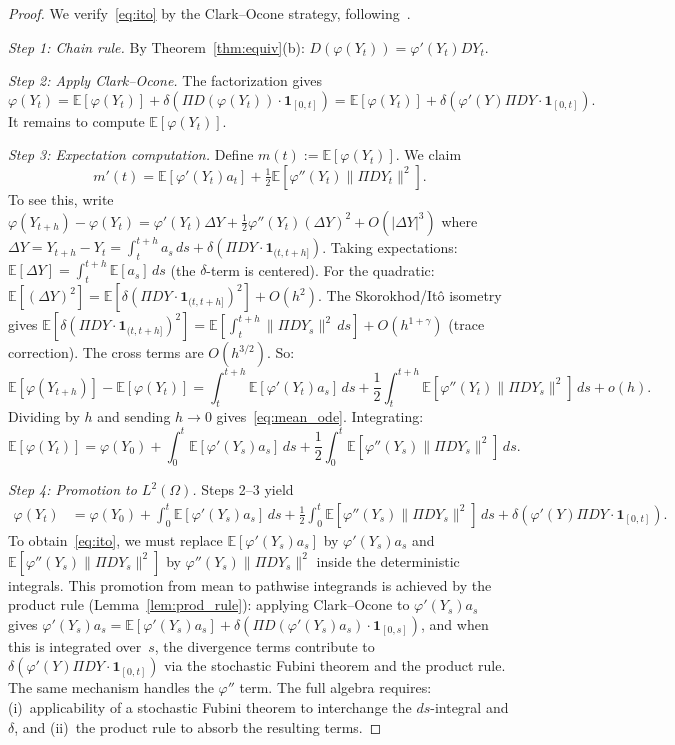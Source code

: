 \documentclass[11pt,a4paper]{article}
\theoremstyle{plain}
\theoremstyle{definition}
\theoremstyle{remark}
\newcommand{\E}{\mathbb{E}}
\begin{document}
\begin{proof}
We verify~\eqref{eq:ito} by the Clark--Ocone strategy, following~\cite[Theorem 4.1]{Decreusefond1999}.

\emph{Step 1: Chain rule.} By Theorem~\ref{thm:equiv}(b): $D(\varphi(Y_t)) = \varphi'(Y_t)DY_t$.

\emph{Step 2: Apply Clark--Ocone.} The factorization gives
\[
\varphi(Y_t) = \E[\varphi(Y_t)] + \delta(\Pi D(\varphi(Y_t))\cdot\mathbf{1}_{[0,t]}) = \E[\varphi(Y_t)] + \delta(\varphi'(Y)\Pi DY\cdot\mathbf{1}_{[0,t]}).
\]
It remains to compute $\E[\varphi(Y_t)]$.

\emph{Step 3: Expectation computation.} Define $m(t) := \E[\varphi(Y_t)]$. We claim
\begin{equation}\label{eq:mean_ode}
m'(t) = \E[\varphi'(Y_t)a_t] + \tfrac{1}{2}\E[\varphi''(Y_t)\|\Pi DY_t\|^2].
\end{equation}
To see this, write $\varphi(Y_{t+h})-\varphi(Y_t) = \varphi'(Y_t)\Delta Y + \frac{1}{2}\varphi''(Y_t)(\Delta Y)^2+O(|\Delta Y|^3)$ where $\Delta Y = Y_{t+h}-Y_t = \int_t^{t+h}a_s\,ds + \delta(\Pi DY\cdot\mathbf{1}_{(t,t+h]})$. Taking expectations: $\E[\Delta Y] = \int_t^{t+h}\E[a_s]\,ds$ (the $\delta$-term is centered). For the quadratic: $\E[(\Delta Y)^2] = \E[\delta(\Pi DY\cdot\mathbf{1}_{(t,t+h]})^2]+O(h^2)$. The Skorokhod/It\^o isometry gives $\E[\delta(\Pi DY\cdot\mathbf{1}_{(t,t+h]})^2] = \E[\int_t^{t+h}\|\Pi DY_s\|^2\,ds]+O(h^{1+\gamma})$ (trace correction). The cross terms are $O(h^{3/2})$. So:
\[
\E[\varphi(Y_{t+h})]-\E[\varphi(Y_t)] = \int_t^{t+h}\E[\varphi'(Y_t)a_s]\,ds + \frac{1}{2}\int_t^{t+h}\E[\varphi''(Y_t)\|\Pi DY_s\|^2]\,ds + o(h).
\]
Dividing by $h$ and sending $h\to 0$ gives~\eqref{eq:mean_ode}. Integrating:
\begin{equation}\label{eq:mean_formula}
\E[\varphi(Y_t)] = \varphi(Y_0) + \int_0^t\E[\varphi'(Y_s)a_s]\,ds + \frac{1}{2}\int_0^t\E[\varphi''(Y_s)\|\Pi DY_s\|^2]\,ds.
\end{equation}

\emph{Step 4: Promotion to $L^2(\Omega)$.} Steps 2--3 yield
\begin{align*}
\varphi(Y_t) &= \varphi(Y_0)+\int_0^t\E[\varphi'(Y_s)a_s]\,ds+\frac{1}{2}\int_0^t\E[\varphi''(Y_s)\|\Pi DY_s\|^2]\,ds + \delta(\varphi'(Y)\Pi DY\cdot\mathbf{1}_{[0,t]}).
\end{align*}
To obtain~\eqref{eq:ito}, we must replace $\E[\varphi'(Y_s)a_s]$ by $\varphi'(Y_s)a_s$ and $\E[\varphi''(Y_s)\|\Pi DY_s\|^2]$ by $\varphi''(Y_s)\|\Pi DY_s\|^2$ inside the deterministic integrals. This promotion from mean to pathwise integrands is achieved by the product rule (Lemma~\ref{lem:prod_rule}): applying Clark--Ocone to $\varphi'(Y_s)a_s$ gives $\varphi'(Y_s)a_s = \E[\varphi'(Y_s)a_s]+\delta(\Pi D(\varphi'(Y_s)a_s)\cdot\mathbf{1}_{[0,s]})$, and when this is integrated over~$s$, the divergence terms contribute to $\delta(\varphi'(Y)\Pi DY\cdot\mathbf{1}_{[0,t]})$ via the stochastic Fubini theorem and the product rule. The same mechanism handles the $\varphi''$ term. The full algebra requires: (i)~applicability of a stochastic Fubini theorem to interchange the $ds$-integral and $\delta$, and (ii)~the product rule to absorb the resulting terms.


\end{proof}
\end{document}
